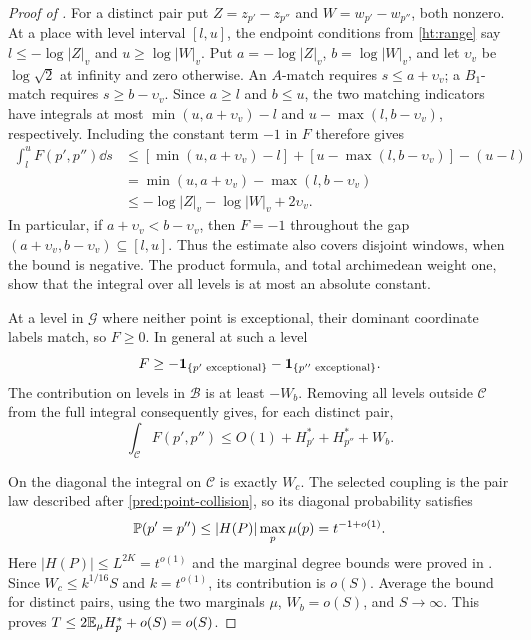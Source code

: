 \begin{proof}[Proof of ]
For a distinct pair put \(Z=z_{p'}-z_{p''}\) and
\(W=w_{p'}-w_{p''}\), both nonzero. At a place with level interval
\([l,u]\), the endpoint conditions from \eqref{ht:range} say
\(l\le-\log|Z|_v\) and \(u\ge\log|W|_v\).
Put \(a=-\log|Z|_v\), \(b=\log|W|_v\), and let \(\upsilon_v\) be
\(\log\sqrt2\) at infinity and zero otherwise.
An \(A\)-match requires \(s\le a+\upsilon_v\); a \(B_1\)-match requires
\(s\ge b-\upsilon_v\). Since \(a\ge l\) and \(b\le u\), the two
matching indicators have integrals at most \(\min(u,a+\upsilon_v)-l\)
and \(u-\max(l,b-\upsilon_v)\), respectively. Including the constant
term \(-1\) in \(F\) therefore gives
\begin{align*}
 \int_l^u F(p',p'')\dd s
 &\le [\min(u,a+\upsilon_v)-l]
       +[u-\max(l,b-\upsilon_v)]-(u-l)\\
 &=\min(u,a+\upsilon_v)-\max(l,b-\upsilon_v)\\
 &\le-\log|Z|_v-\log|W|_v+2\upsilon_v.
\end{align*}
In particular, if \(a+\upsilon_v<b-\upsilon_v\), then \(F=-1\)
throughout the gap \((a+\upsilon_v,b-\upsilon_v)\subseteq[l,u]\).
Thus the estimate also covers disjoint windows, when the bound is negative.
The product formula, and total archimedean weight one, show that the
integral over all levels is at most an absolute constant.

At a level in $\mathcal G$ where neither point is exceptional, their dominant
coordinate labels match, so \(F\ge0\). In general at such a level
\[
 F\ge-\mathbf 1_{\{p'\text{ exceptional}\}}-
         \mathbf 1_{\{p''\text{ exceptional}\}}.
\]
The contribution on levels in $\mathcal B$ is at least \(-W_b\). Removing all
levels outside $\mathcal C$ from the full integral consequently gives, for each
distinct pair,
\[
 \int_{\mathcal C}F(p',p'')
       \le O(1)+H_{p'}^*+H_{p''}^*+W_b.
\]

On the diagonal the integral on $\mathcal C$ is exactly \(W_c\). The
selected coupling is the pair law described after
\eqref{pred:point-collision}, so its diagonal probability satisfies
\[
 \mathbb P(p'=p'')\le |H(P)|\max_p\mu(p)=t^{-1+o(1)}.
\]
Here \(|H(P)|\le L^{2K}=t^{o(1)}\) and the marginal degree bounds were
proved in . Since
\(W_c\le k^{1/16}S\) and \(k=t^{o(1)}\), its contribution is \(o(S)\).
Average the bound for distinct pairs, using the two marginals \(\mu\),
\(W_b=o(S)\), and \(S\to\infty\). This proves
\(T\le2\mathbb E_\mu H_p^*+o(S)=o(S)\).


\end{proof}
